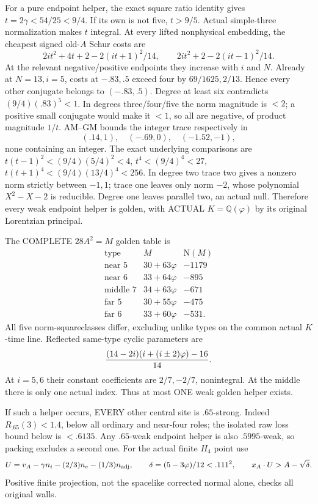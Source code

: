 \documentclass[11pt]{article}
\begin{document}
For a pure endpoint helper, the exact square
ratio identity gives \(t=2\gamma<54/25<9/4\).
If its own is not five, \(t>9/5\).
Actual simple-three normalization makes \(t\)
integral.
At every lifted nonphysical embedding, the
cheapest signed old-\(A\) Schur costs are
\[
 2it^2+4t+2-2(it+1)^2/14,\qquad
 2it^2+2-2(it-1)^2/14 .
\]
At the relevant negative/positive endpoints
they increase with \(i\) and \(N\).
Already at \(N=13,i=5\), costs at \(-.83,.5\)
exceed four by \(69/1625,2/13\).
Hence every other conjugate belongs to
\((-.83,.5)\).
Degree at least six contradicts
\((9/4)(.83)^5<1\).
In degrees three/four/five the norm magnitude
is \(<2\); a positive small conjugate would
make it \(<1\), so all are negative, of product
magnitude \(1/t\).
AM--GM bounds the integer trace respectively in
\[
                         (.14,1),\quad(-.69,0),\quad(-1.52,-1),
\]
none containing an integer.
The exact underlying comparisons are
\(t(t-1)^2<(9/4)(5/4)^2<4\),
\(t^4<(9/4)^4<27\),
\(t(t+1)^4<(9/4)(13/4)^4<256\).
In degree two trace two gives a nonzero norm
strictly between \(-1,1\);
trace one leaves only norm \(-2\), whose
polynomial \(X^2-X-2\) is reducible.
Degree one leaves parallel two, an actual null.
Therefore every weak endpoint helper is golden,
with ACTUAL \(K=\mathbb Q(\varphi)\) by its
original Lorentzian principal.

The COMPLETE \(28A^2=M\) golden table is
\[
\begin{array}{c|c|r}
 \text{type}&M&\mathrm N(M)\\ \hline
 \text{near }5&30+63\varphi&-1179\\
 \text{near }6&33+64\varphi&-895\\
 \text{middle }7&34+63\varphi&-671\\
 \text{far }5&30+55\varphi&-475\\
 \text{far }6&33+60\varphi&-531 .
\end{array}
\]
All five norm-squareclasses differ, excluding
unlike types on the common actual \(K\)-time line.
Reflected same-type cyclic parameters are
\[
                  { (14-2i)(i+(i\pm2)\varphi)-16\over14}.
\]
At \(i=5,6\) their constant coefficients are
\(2/7,-2/7\), nonintegral.
At the middle there is only one actual index.
Thus at most ONE weak golden helper exists.

If such a helper occurs, EVERY other central
site is \(.65\)-strong.
Indeed \(R_{.65}(3)<1.4\), below all ordinary
and near-four roles; the isolated raw loss
bound below is \(<.6135\).
Any \(.65\)-weak endpoint helper is also
\(.5995\)-weak, so packing excludes a second one.
For the actual finite \(H_4\) point use
\[
 U=v_A-\gamma n_i-(2/3)n_e-(1/3)n_{\rm adj},
 \qquad\delta=(5-3\varphi)/12<.111^2,
 \qquad x_A\cdot U>A-\sqrt\delta .
\]
Positive finite projection, not the spacelike
corrected normal alone, checks all original
walls.
\end{document}
